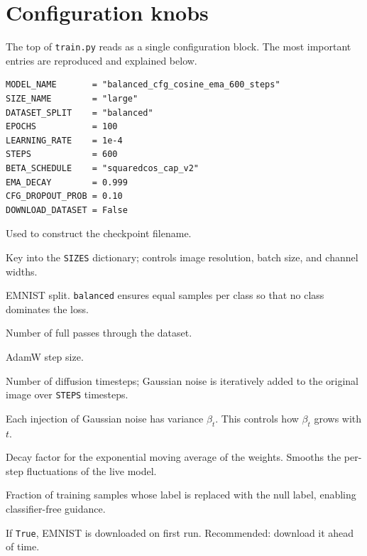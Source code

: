 \documentclass[11pt]{article}
\newcommand{\code}[1]{\texttt{#1}}
\begin{document}
\section{Configuration knobs}

The top of \code{train.py} reads as a single configuration block. The most
important entries are reproduced and explained below.

\begin{lstlisting}
MODEL_NAME       = "balanced_cfg_cosine_ema_600_steps"
SIZE_NAME        = "large"
DATASET_SPLIT    = "balanced"
EPOCHS           = 100
LEARNING_RATE    = 1e-4
STEPS            = 600
BETA_SCHEDULE    = "squaredcos_cap_v2"
EMA_DECAY        = 0.999
CFG_DROPOUT_PROB = 0.10
DOWNLOAD_DATASET = False
\end{lstlisting}

\begin{description}[style=nextline,leftmargin=1.5em]
  \item[\code{MODEL\_NAME}] Used to construct the checkpoint filename.
  \item[\code{SIZE\_NAME}] Key into the \code{SIZES} dictionary; controls
    image resolution, batch size, and channel widths.
  \item[\code{DATASET\_SPLIT}] EMNIST split. \texttt{balanced} ensures equal
    samples per class so that no class dominates the loss.
  \item[\code{EPOCHS}] Number of full passes through the dataset.
  \item[\code{LEARNING\_RATE}] AdamW step size.
  \item[\code{STEPS}] Number of diffusion timesteps; Gaussian noise is
    iteratively added to the original image over \code{STEPS} timesteps.
  \item[\code{BETA\_SCHEDULE}] Each injection of Gaussian noise has variance
    $\beta_t$. This controls how $\beta_t$ grows with $t$.
  \item[\code{EMA\_DECAY}] Decay factor for the exponential moving average of
    the weights. Smooths the per-step fluctuations of the live model.
  \item[\code{CFG\_DROPOUT\_PROB}] Fraction of training samples whose label is
    replaced with the null label, enabling classifier-free guidance.
  \item[\code{DOWNLOAD\_DATASET}] If \code{True}, EMNIST is downloaded on
    first run. Recommended: download it ahead of time.
\end{description}
\end{document}
